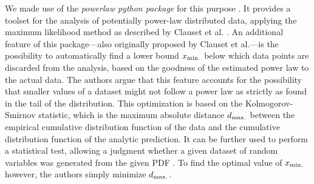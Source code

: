 \documentclass[10pt,a4paper]{article}
\begin{document}
We made use of the \textit{powerlaw python package} for this purpose \cite{Powerlaw_Package,Alstott_2014}. It provides a toolset for the analysis of potentially power-law distributed data, applying the maximum likelihood method as described by Clauset et al. \cite{Clauset_2009}. An additional feature of this package---also originally proposed by Clauset et al.---is the possibility to automatically find a lower bound $x_{\rm min.}$ below which data points are discarded from the analysis, based on the goodness of the estimated power law to the actual data. The authors argue that this feature accounts for the possibility that smaller values of a dataset might not follow a power law as strictly as found in the tail of the distribution. This optimization is based on the Kolmogorov-Smirnov statistic, which is the maximum absolute distance $d_{\rm max.}$ between the empirical cumulative distribution function of the data and the cumulative distribution function of the analytic prediction. It can be further used to perform a statistical test, allowing a judgment whether a given dataset of random variables was generated from the given PDF \cite{EncyMath_Kolmogorov_Smirnov}. To find the optimal value of $x_{\rm min.}$ however, the authors simply minimize $d_{\rm max.}$. 
\end{document}
